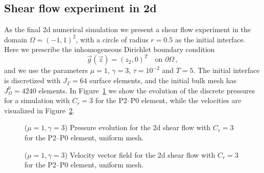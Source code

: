 \documentclass[a4paper,11pt,onecolumn]{article}
\begin{document}
\subsection{Shear flow experiment in 2d}
As the final 2d numerical simulation we present a shear flow experiment
in the domain $\Omega=(-1,1)^2$, with a circle of radius $r=0.5$ as the
initial interface. Here we prescribe the inhomogeneous Dirichlet boundary
condition
\begin{equation*}
\vec g(\vec z)=(z_2,0)^T\quad \mbox{on }\partial\Omega\,,
\end{equation*}
and we use the parameters $\mu=1$, $\gamma=3$, $\tau=10^{-2}$ and $T=5$.
The initial interface is discretized with $J_\Gamma = 64$ surface elements,
and the initial bulk mesh has $J_\Omega^0 = 4240$ elements. In
Figure~\ref{fig:shear_2d} we show the evolution of the discrete pressures
for a simulation with $C_r=3$ for the P2--P0 element, while the velocities
are visualized in Figure~\ref{fig:shear_2d_velocity}.
\begin{figure}[htbp]
\centering
{}
\caption{($\mu=1,\gamma=3$) Pressure evolution for the 2d shear flow with
$C_r=3$ for the P2--P0 element, uniform mesh.}
\label{fig:shear_2d}
\end{figure}

\begin{figure}[htbp]
\centering
{}
\caption{($\mu=1,\gamma=3$) Velocity vector field for the 2d shear flow with
$C_r=3$ for the P2--P0 element, uniform mesh.}
\label{fig:shear_2d_velocity}
\end{figure}
\end{document}
